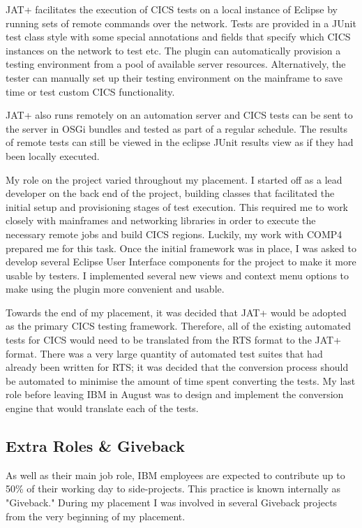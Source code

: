 \documentclass[12pt,a4paper]{article}
\begin{document}
JAT+ facilitates the execution of CICS tests on a local instance of Eclipse by
running sets of remote commands over the network. Tests are provided in a JUnit
test class style with some special annotations and fields that specify which
CICS instances on the network to test etc. The plugin can automatically
provision a testing environment from a pool of available server resources.
Alternatively, the tester can manually set up their testing environment on the
mainframe to save time or test custom CICS functionality.

JAT+ also runs remotely on an automation server and CICS tests can be sent to
the server in OSGi bundles and tested as part of a regular schedule. The results
of remote tests can still be viewed in the eclipse JUnit results view as if they
had been locally executed.

My role on the project varied throughout my placement. I started off as a lead
developer on the back end of the project, building classes that facilitated the
initial setup and provisioning stages of test execution. This required me to
work closely with mainframes and networking libraries in order to execute the
necessary remote jobs and build CICS regions. Luckily, my work with COMP4
prepared me for this task. Once the initial framework was in place, I was asked
to develop several Eclipse User Interface components for the project to make it
more usable by testers. I implemented several new views and context menu options
to make using the plugin more convenient and usable.

Towards the end of my placement, it was decided that JAT+ would be adopted as 
the primary CICS testing framework. Therefore, all of the existing automated
tests for CICS would need to be translated from the RTS format to the JAT+ 
format. There was a very large quantity of automated test suites that had 
already been written for RTS; it was decided that the conversion process should
be automated to minimise the amount of time spent converting the tests. My last
role before leaving IBM in August was to design and implement the conversion 
engine that would translate each of the tests. 

\subsection{Extra Roles \& Giveback}
As well as their main job role, IBM employees are expected to contribute up to 
50\% of their working day to side-projects. This practice is known internally
as "Giveback." During my placement I was involved in several Giveback projects
from the very beginning of my placement.
\end{document}
